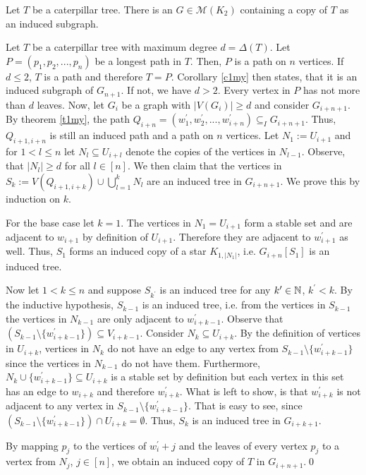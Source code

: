 \begin{thm}
Let $T$ be a caterpillar tree. There is an $G\in\mathcal{M}(K_2)$ containing a copy of $T$ as an induced subgraph.
\end{thm}
\begin{prf}
Let $T$ be a caterpillar tree with maximum degree $d = \Delta (T)$. Let $P=(p_1,p_2,...,p_n)$ be a longest path in $T$. Then, $P$ is a path on $n$ vertices. If $d\leq 2$, $T$ is a path and therefore $T=P$. Corollary \ref{c1my} then states, that it is an induced subgraph of $G_{n+1}$. 
If not, we have $d>2$. Every vertex in $P$ has not more than $d$ leaves. Now, let $G_i$ be a graph with $|V(G_i)| \geq d$ and consider $G_{i+n+1}$. By theorem \ref{t1my}, the path $Q_{i+n}=(w^\prime_1,w^\prime_2,...,w^\prime_{i+n})\subseteq_I G_{i+n+1}$. Thus, $Q_{i+1,i+n}$ is still an induced path and a path on $n$ vertices. Let $N_1:=U_{i+1}$ and for $1<l\leq n$ let $N_l\subseteq U_{i+l}$ denote the copies of the vertices in $N_{l-1}$. Observe, that $\vert N_l \vert \geq d$ for all $l\in [n]$. We then claim that the vertices in $S_k:=V(Q_{i+1,i+k})\cup\bigcup_{l=1}^k N_l$ are an induced tree in $G_{i+n+1}$. We prove this by induction on $k$.

For the base case let $k=1$. The vertices in $N_1=U_{i+1}$ form a stable set  and are adjacent to $w_{i+1}$ by definition of $U_{i+1}$. Therefore they are adjacent to $w^\prime_{i+1}$ as well. Thus, $S_1$ forms an induced copy of a star $K_{1,\vert N_1\vert}$, i.e. $G_{i+n}[S_1]$ is an induced tree.

Now let $1<k\leq n$ and suppose $S_{k^\prime}$ is an induced tree for any $k^\prime\in\mathbb{N}$, $k^\prime <k$. By the inductive hypothesis, $S_{k-1}$ is an induced tree, i.e. from the vertices in $S_{k-1}$ the vertices in $N_{k-1}$ are only adjacent to $w_{i+k-1}^\prime$. Observe that $(S_{k-1}\setminus \lbrace w_{i+k-1}^\prime\rbrace )\subseteq V_{i+k-1}$. Consider $N_k\subseteq U_{i+k}$. By the definition of vertices in $U_{i+k}$, vertices in $N_k$ do not have an edge to any vertex from $S_{k-1}\setminus \lbrace w_{i+k-1}^\prime\rbrace$ since the vertices in $N_{k-1}$ do not have them. Furthermore, $N_k\cup\lbrace w_{i+k-1}^\prime\rbrace \subseteq U_{i+k}$ is a stable set by definition but each vertex in this set has an edge to $w_{i+k}$ and therefore $w_{i+k}^\prime$. What is left to show, is that $w_{i+k}^\prime$ is not adjacent to any vertex in $S_{k-1}\setminus \lbrace w_{i+k-1}^\prime\rbrace$. That is easy to see, since $(S_{k-1}\setminus \lbrace w_{i+k-1}^\prime\rbrace )\cap U_{i+k}=\emptyset$. Thus, $S_k$ is an induced tree in $G_{i+k+1}$.

By mapping $p_j$ to the vertices of $w^\prime_i+j$ and the leaves of every vertex $p_j$ to a vertex from $N_j$, $j\in [n]$, we obtain an induced copy of $T$ in $G_{i+n+1}$.\qed
\end{prf}

